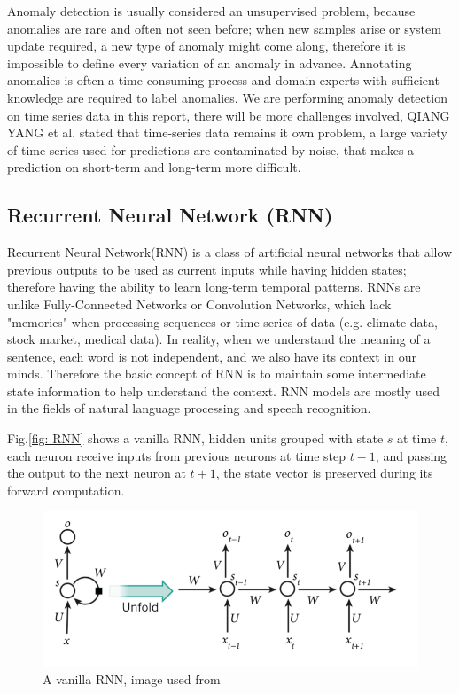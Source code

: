 \documentclass{article}
\begin{document}
Anomaly detection is usually considered an unsupervised problem,
because anomalies are rare and often not seen before; when new
samples arise or system update required, a new type of anomaly might come
along, therefore it is impossible to define every variation of an anomaly in
advance.
Annotating anomalies is often a time-consuming process and domain experts
with sufficient knowledge are required to label anomalies. We are performing
anomaly detection on time series data in this report,
there will be more challenges involved, QIANG YANG
et al. \cite{2-10challengingproblems} stated that time-series data remains it
own problem,  a large variety of time series used for predictions are
contaminated by noise, that makes a prediction on short-term and
long-term more difficult.



\subsection{Recurrent Neural Network (RNN)}

Recurrent Neural Network(RNN) is a class of artificial neural networks that
allow previous outputs to be used as current inputs
while having hidden states; therefore having the ability to learn long-term
temporal patterns. RNNs are unlike Fully-Connected Networks or Convolution
Networks, which lack "memories" when processing sequences or time series of
data (e.g. climate data, stock market, medical data). In reality,
when we understand the meaning of a sentence, each word is not independent, and
we also have its context in our minds. Therefore the basic concept of RNN is to
maintain some intermediate state information to help understand the
context. RNN models are mostly used in the fields of
natural language processing and speech recognition. 

Fig.\ref{fig: RNN} shows a vanilla RNN, hidden units grouped with state $s$ at
time $t$, each neuron receive inputs from previous neurons at time step $t-1$,
and passing the output to the next neuron at $t+1$, the state vector is
preserved during its forward computation. 

\begin{figure}[htb]
    \centering
\includegraphics[scale=0.24]{png/RNN.png}
    \caption{A vanilla RNN, image used from \cite{3-deeplearning}}
    \label{fig:RNN}
\end{figure}
\end{document}
